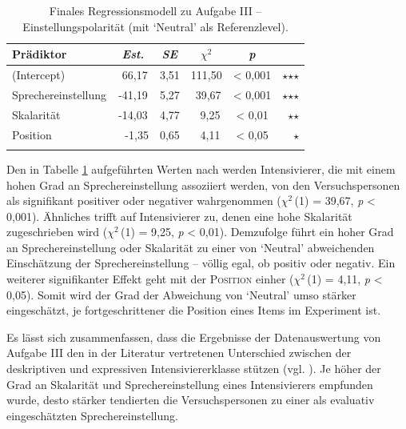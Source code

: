 %
\begin{table}
\begin{tabularx}{.8\textwidth}{Xccccr}
\lsptoprule
Prädiktor & \textit{Est.} & \textit{SE} & \textit{$\chi$$^{2}$} & \textit{p} & \\
\midrule
(Intercept) & \textcolor{white}{-}66,17 & 3,51 & 111,50 & < 0,001 & $\star$$\star$$\star$\\
Sprechereinstellung & -41,19 & 5,27 & \textcolor{white}{-}39,67 & < 0,001 & $\star$$\star$$\star$ \\
Skalarität & -14,03 & 4,77 & \textcolor{white}{-}\textcolor{white}{-}9,25 & < 0,01 & $\star$$\star$\\ 
Position & \textcolor{white}{-}\textcolor{white}{-}-1,35 & 0,65 & \textcolor{white}{-}\textcolor{white}{-}4,11 & < 0,05 & $\star$\\
\lspbottomrule
\end{tabularx}
\caption[Finales Regressionsmodell zu Aufgabe III von Experiment 1 (mit `Neutral' als Referenzlevel)]{Finales Regressionsmodell zu Aufgabe III -- Einstellungspolarität (mit `Neutral' als Referenzlevel).}
\label{LinReg0004}
\end{table}

\noindent Den in Tabelle \ref{LinReg0004} aufgeführten Werten nach werden Intensivierer, die mit einem hohen Grad an Sprechereinstellung assoziiert werden, von den Versuchspersonen als signifikant positiver oder negativer wahrgenommen ($\chi$$^{2}$\,(1) = 39,67, \textit{p} < 0,001). Ähnliches trifft auf Intensivierer zu, denen eine hohe Skalarität zugeschrieben wird ($\chi$$^{2}$\,(1) = 9,25, \textit{p} < 0,01). Demzufolge führt ein hoher Grad an Sprechereinstellung oder Skalarität zu einer von `Neutral' abweichenden Einschätzung der Sprechereinstellung -- völlig egal, ob positiv oder negativ. Ein weiterer signifikanter Effekt geht mit der \textsc{Position} einher ($\chi$$^{2}$\,(1) = 4,11, {\textit{p} < 0,05}). Somit wird der Grad der Abweichung von `Neutral' umso stärker eingeschätzt, je fortgeschrittener die Position eines Items im Experiment ist.


Es lässt sich zusammenfassen, dass die Ergebnisse der Datenauswertung von Aufgabe III den in der Literatur vertretenen Unterschied zwischen der deskriptiven und expressiven Intensiviererklasse stützen (vgl. {\citealt[135]{Gutzmann.2019a}}). Je höher der Grad an Skalarität und Sprechereinstellung eines Intensivierers empfunden wurde, desto stärker tendierten die Versuchspersonen zu einer als evaluativ eingeschätzten {Sprechereinstellung}.




